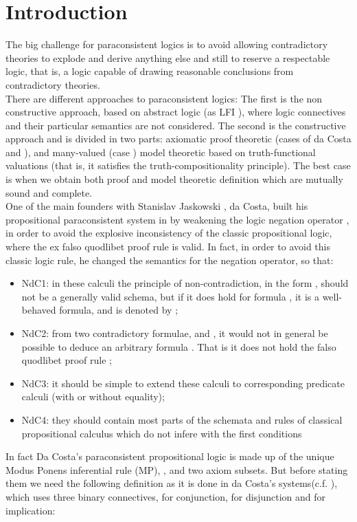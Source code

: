 \documentclass{llncs}
\begin{document}
\section{Introduction}
The big challenge for paraconsistent logics is to avoid
 allowing contradictory theories to explode and derive anything else
 and still to reserve a respectable logic, that is, a logic capable of drawing reasonable
 conclusions from  contradictory theories.\\
   There are different approaches to paraconsistent logics: The first is the non constructive approach, based on abstract logic
 (as LFI \cite{CaCM06}), where  logic connectives and their
 particular semantics are not considered. The second is the constructive approach and is divided in
 two parts: axiomatic proof theoretic (cases of da Costa \cite{Costa74} and
 \cite{AnBe75,Bate80,Bate00}),  and many-valued
 (case \cite{Majk06ml}) model theoretic based on truth-functional valuations (that
 is, it satisfies the truth-compositionality principle). The best
 case is when we obtain both proof and model theoretic definition which are mutually sound and
 complete.\\
 One of the main founders with Stanislav Jaskowski \cite{Jask48}, da
Costa,  built his propositional paraconsistent system  in
\cite{Costa74} by weakening the logic negation operator , in
order to avoid the explosive inconsistency \cite{CaCM06,CaMa02} of
the classic propositional logic, where  the ex falso quodlibet proof
rule  is valid. In fact, in order to avoid
this classic logic rule, he changed the semantics for the negation
operator, so that:
\begin{itemize}
  \item NdC1:  in these calculi the principle of non-contradiction,
  in the form , should not be a generally valid
  schema, but if it does hold for  formula , it is a well-behaved
  formula, and is denoted by ;
  \item NdC2: from two contradictory formulae,  and , it
  would not in general be possible to deduce an arbitrary formula
  . That is it does not hold the falso
quodlibet proof rule ;
  \item NdC3: it should be simple to extend these calculi to corresponding
  predicate calculi (with or without equality);
  \item NdC4: they should contain  most parts of the schemata and
  rules of  classical propositional calculus which do not infere
  with the first conditions
\end{itemize}
In fact Da Costa's paraconsistent propositional logic is made up of
the unique Modus Ponens inferential rule (MP), , and two axiom subsets. But before stating them we need
the following definition as it is done in da Costa's systems(c.f.
\cite[p.500]{Costa74}), which uses three binary connectives,
 for conjunction,  for disjunction and 
for implication:
\end{document}
